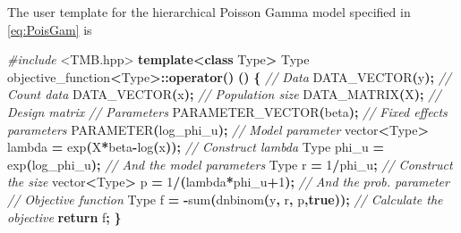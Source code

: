 \documentclass[a4paper,twoside,11pt]{report} %
\newenvironment{Shaded}{\begin{snugshade}}{\end{snugshade}}
\newcommand{\CommentTok}[1]{\textcolor[rgb]{0.56,0.35,0.01}{\textit{#1}}}
\newcommand{\ControlFlowTok}[1]{\textcolor[rgb]{0.13,0.29,0.53}{\textbf{#1}}}
\newcommand{\DecValTok}[1]{\textcolor[rgb]{0.00,0.00,0.81}{#1}}
\newcommand{\ImportTok}[1]{#1}
\newcommand{\KeywordTok}[1]{\textcolor[rgb]{0.13,0.29,0.53}{\textbf{#1}}}
\newcommand{\NormalTok}[1]{#1}
\newcommand{\OperatorTok}[1]{\textcolor[rgb]{0.81,0.36,0.00}{\textbf{#1}}}
\newcommand{\PreprocessorTok}[1]{\textcolor[rgb]{0.56,0.35,0.01}{\textit{#1}}}
\theoremstyle{definition}
\theoremstyle{definition}
\theoremstyle{definition}
\theoremstyle{definition}
\theoremstyle{remark}
\begin{document}
The user template for the hierarchical Poisson Gamma model specified in \eqref{eq:PoisGam} is

\begin{Shaded}
\begin{Highlighting}[]
\PreprocessorTok{\#include }\ImportTok{\textless{}TMB.hpp\textgreater{}}
\KeywordTok{template}\OperatorTok{\textless{}}\KeywordTok{class}\NormalTok{ Type}\OperatorTok{\textgreater{}}
\NormalTok{Type objective\_function}\OperatorTok{\textless{}}\NormalTok{Type}\OperatorTok{\textgreater{}::}\KeywordTok{operator}\OperatorTok{()} \OperatorTok{()}
\OperatorTok{\{}
  \CommentTok{// Data}
\NormalTok{  DATA\_VECTOR}\OperatorTok{(}\NormalTok{y}\OperatorTok{);}                             \CommentTok{// Count data}
\NormalTok{  DATA\_VECTOR}\OperatorTok{(}\NormalTok{x}\OperatorTok{);}                             \CommentTok{// Population size}
\NormalTok{  DATA\_MATRIX}\OperatorTok{(}\NormalTok{X}\OperatorTok{);}                             \CommentTok{// Design matrix}
  \CommentTok{// Parameters}
\NormalTok{  PARAMETER\_VECTOR}\OperatorTok{(}\NormalTok{beta}\OperatorTok{);}                     \CommentTok{// Fixed effects parameters}
\NormalTok{  PARAMETER}\OperatorTok{(}\NormalTok{log\_phi\_u}\OperatorTok{);}                       \CommentTok{// Model parameter}
\NormalTok{  vector}\OperatorTok{\textless{}}\NormalTok{Type}\OperatorTok{\textgreater{}}\NormalTok{ lambda  }\OperatorTok{=}\NormalTok{ exp}\OperatorTok{(}\NormalTok{X}\OperatorTok{*}\NormalTok{beta}\OperatorTok{{-}}\NormalTok{log}\OperatorTok{(}\NormalTok{x}\OperatorTok{));}  \CommentTok{// Construct \textquotesingle{}lambda\textquotesingle{}}
\NormalTok{  Type phi\_u }\OperatorTok{=}\NormalTok{ exp}\OperatorTok{(}\NormalTok{log\_phi\_u}\OperatorTok{);}                \CommentTok{// And the model parameters}
\NormalTok{  Type r }\OperatorTok{=} \DecValTok{1}\OperatorTok{/}\NormalTok{phi\_u}\OperatorTok{;}                           \CommentTok{// Construct the size}
\NormalTok{  vector}\OperatorTok{\textless{}}\NormalTok{Type}\OperatorTok{\textgreater{}}\NormalTok{ p }\OperatorTok{=} \DecValTok{1}\OperatorTok{/(}\NormalTok{lambda}\OperatorTok{*}\NormalTok{phi\_u}\OperatorTok{+}\DecValTok{1}\OperatorTok{);}        \CommentTok{// And the prob. parameter}
  \CommentTok{// Objective function}
\NormalTok{  Type f }\OperatorTok{=} \OperatorTok{{-}}\NormalTok{sum}\OperatorTok{(}\NormalTok{dnbinom}\OperatorTok{(}\NormalTok{y}\OperatorTok{,}\NormalTok{ r}\OperatorTok{,}\NormalTok{ p}\OperatorTok{,}\KeywordTok{true}\OperatorTok{));}       \CommentTok{// Calculate the objective}
  \ControlFlowTok{return}\NormalTok{ f}\OperatorTok{;}
\OperatorTok{\}}
\end{Highlighting}
\end{Shaded}
\end{document}
